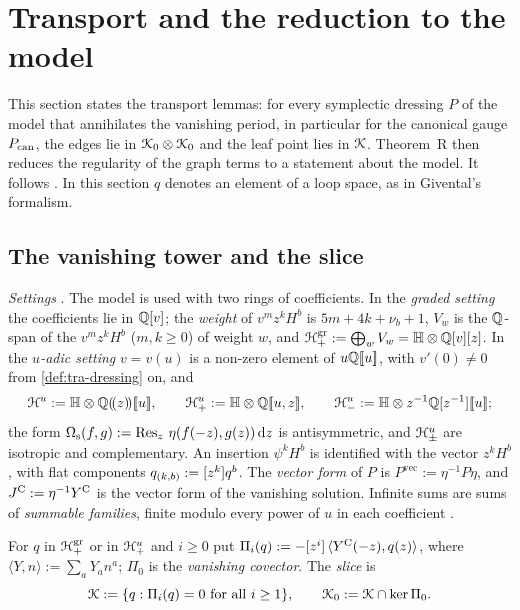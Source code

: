 \section{Transport and the reduction to the model}
\label{sec:tra}

This section states the transport lemmas: for every symplectic dressing $P$ of the model that annihilates the vanishing period, in particular for the canonical gauge $P_{\mathrm{can}}$, the edges lie in $\mathcal{K}_{0}\otimes\mathcal{K}_{0}$ and the leaf point lies in $\mathcal{K}$. Theorem~R then reduces the regularity of the graph terms to a statement about the model. It follows . In this section $q$ denotes an element of a loop space, as in Givental's formalism.

\subsection{The vanishing tower and the slice}
\label{sec:tra-tower}

\emph{Settings} . The model is used with two rings of coefficients. In the \emph{graded setting} the coefficients lie in $\mathbb{Q}[v]$; the \emph{weight} of $v^mz^kH^b$ is $5m+4k+\nu_b+1$, $V_w$ is the $\mathbb{Q}$-span of the $v^mz^kH^b$ ($m,k\geq0$) of weight $w$, and $\mathcal{H}^{\mathrm{gr}}_+:=\bigoplus_wV_w=\mathbb{H}\otimes\mathbb{Q}[v][z]$. In the \emph{$u$-adic setting} $v=v(u)$ is a non-zero element of $u\mathbb{Q}[\![ u ]\!]$, with $v'(0)\neq0$ from \cref{def:tra-dressing} on, and
\[
\cH^u:=\bbH\otimes\bbQ\lser z\fps u,\qquad\cH^u_+:=\bbH\otimes\bbQ\fps{u,z},\qquad\cH^u_-:=\bbH\otimes z^{-1}\bbQ[z^{-1}]\fps u ;
\]
the form $\Omega_{\mathrm s}(f,g):=\operatorname*{Res}_z\,\eta(f(-z),g(z))\,\mathrm{d} z$ is antisymmetric, and $\mathcal{H}^u_\pm$ are isotropic and complementary. An insertion $\psi^kH^b$ is identified with the vector $z^kH^b$, with flat components $q_{(k,b)}:=[z^k]q^b$. The \emph{vector form} of $P$ is $P^{\mathrm{vec}}:=\eta^{-1}P\eta$, and $J^{\mathrm C}:=\eta^{-1}Y^{\mathrm{C}}$ is the vector form of the vanishing solution. Infinite sums are sums of \emph{summable families}, finite modulo every power of $u$ in each coefficient .

\begin{defn}
\label{def:tra-tower}
For $q$ in $\mathcal{H}^{\mathrm{gr}}_+$ or in $\mathcal{H}^u_+$ and $i\geq0$ put $\Pi_i(q):=-[z^i]\,\langle Y^{\mathrm{C}}(-z),q(z)\rangle$, where $\langle Y,n\rangle:=\sum_aY_an^a$; $\Pi_0$ is the \emph{vanishing covector}. The \emph{slice} is
\[
\mathcal{K}:=\{q:\Pi_i(q)=0\ \text{for all }i\geq1\},\qquad\mathcal{K}_{0}:=\mathcal{K}\cap\ker\Pi_0 .
\]
\end{defn}

